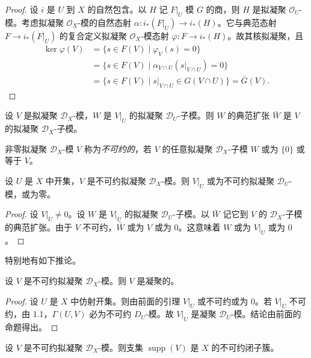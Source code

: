 \begin{proof}
设 $i$ 是 $U$ 到 $X$ 的自然包含。以 $H$ 记 $F|_U$ 模 $G$ 的商，则 $H$ 是拟凝聚 $\mathcal{O}_U$-模。考虑拟凝聚 $\mathcal{O}_X$-模的自然态射 $\alpha:i_*(F|_U)\to i_*(H)$。它与典范态射 $F\to i_*(F|_U)$ 的复合定义拟凝聚 $\mathcal{O}_X$-模态射 $\varphi:F\to i_*(H)$。故其核拟凝聚，且
\begin{align*}
\ker\varphi(V)&=\{s\in F(V)\mid \varphi_V(s)=0\}\\
&=\{s\in F(V)\mid \alpha_{V\cap U}(s|_{V\cap U})=0\}\\
&=\{s\in F(V)\mid s|_{V\cap U}\in G(V\cap U)\}=\bar G(V).
\end{align*}
\end{proof}

设 $V$ 是拟凝聚 $\mathcal{D}_X$-模，$W$ 是 $V|_U$ 的拟凝聚 $\mathcal{D}_U$-子模。则 $W$ 的典范扩张 $\bar W$ 是 $V$ 的拟凝聚 $\mathcal{D}_X$-子模。

非零拟凝聚 $\mathcal{D}_X$-模 $V$ 称为\emph{不可约的}，若 $V$ 的任意拟凝聚 $\mathcal{D}_X$-子模 $W$ 或为 $\{0\}$ 或等于 $V$。

\begin{lemma}
设 $U$ 是 $X$ 中开集，$V$ 是不可约拟凝聚 $\mathcal{D}_X$-模。则 $V|_U$ 或为不可约拟凝聚 $\mathcal{D}_U$-模，或为零。
\end{lemma}

\begin{proof}
设 $V|_U\neq 0$。设 $W$ 是 $V|_U$ 的拟凝聚 $\mathcal{D}_U$-子模。以 $\bar W$ 记它到 $V$ 的 $\mathcal{D}_X$-子模的典范扩张。由于 $V$ 不可约，$\bar W$ 或为 $V$ 或为 $0$。这意味着 $W$ 或为 $V|_U$ 或为 $0$。
\end{proof}

特别地有如下推论。

\begin{proposition}
设 $V$ 是不可约拟凝聚 $\mathcal{D}_X$-模。则 $V$ 是凝聚的。
\end{proposition}

\begin{proof}
设 $U$ 是 $X$ 中仿射开集。则由前面的引理 $V|_U$ 或不可约或为 $0$。若 $V|_U$ 不可约，由 1.1，$\Gamma(U,V)$ 必为不可约 $D_U$-模。故 $V|_U$ 是凝聚 $\mathcal{D}_U$-模。结论由前面的命题得出。
\end{proof}

\begin{proposition}
设 $V$ 是不可约拟凝聚 $\mathcal{D}_X$-模。则支集 $\operatorname{supp}(V)$ 是 $X$ 的不可约闭子簇。
\end{proposition}

